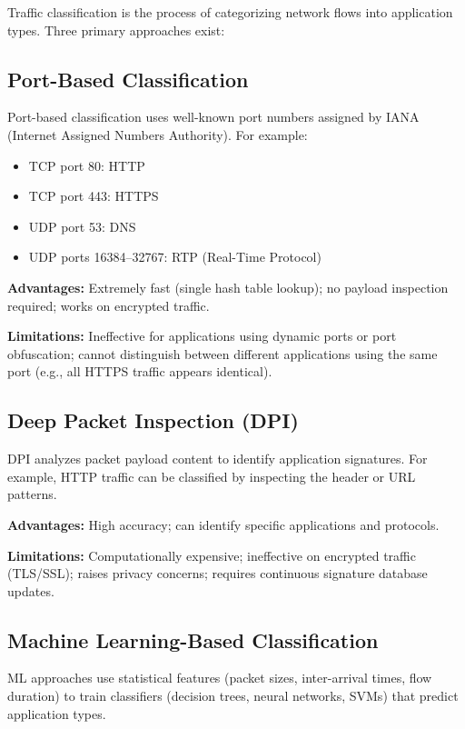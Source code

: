 Traffic classification is the process of categorizing network flows into application types. Three primary approaches exist:

\subsection{Port-Based Classification}

Port-based classification uses well-known port numbers assigned by IANA (Internet Assigned Numbers Authority). For example:
\begin{itemize}
    \item TCP port 80: HTTP
    \item TCP port 443: HTTPS
    \item UDP port 53: DNS
    \item UDP ports 16384–32767: RTP (Real-Time Protocol)
\end{itemize}

\textbf{Advantages:} Extremely fast (single hash table lookup); no payload inspection required; works on encrypted traffic.

\textbf{Limitations:} Ineffective for applications using dynamic ports or port obfuscation; cannot distinguish between different applications using the same port (e.g., all HTTPS traffic appears identical).

\subsection{Deep Packet Inspection (DPI)}

DPI analyzes packet payload content to identify application signatures. For example, HTTP traffic can be classified by inspecting the  header or URL patterns.

\textbf{Advantages:} High accuracy; can identify specific applications and protocols.

\textbf{Limitations:} Computationally expensive; ineffective on encrypted traffic (TLS/SSL); raises privacy concerns; requires continuous signature database updates.

\subsection{Machine Learning-Based Classification}

ML approaches use statistical features (packet sizes, inter-arrival times, flow duration) to train classifiers (decision trees, neural networks, SVMs) that predict application types.

